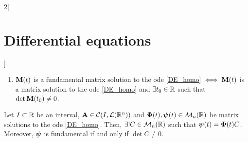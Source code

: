 \documentclass[../../../main.tex]{subfiles}
\begin{document}
\begin{multicols}{2}[\section{Differential equations}]
\begin{prop}
\begin{enumerate}
      \item $\boldsymbol{\mathrm{M}}(t)$ is a fundamental matrix solution to the ode \eqref{DE_homo} $\iff\boldsymbol{\mathrm{M}}(t)$ is a matrix solution to the ode \eqref{DE_homo} and $\exists t_0\in\mathbb{R}$ such that $\det\boldsymbol{\mathrm{M}}(t_0)\ne 0$.
    \end{enumerate}
  \end{prop}
  \begin{prop}
    Let $I\subset \mathbb{R}$ be an interval, $\boldsymbol{\mathrm{A}}\in\mathcal{C}(I,\mathcal{L}(\mathbb{R}^n))$ and $\boldsymbol{\mathrm{\Phi}}(t),\boldsymbol{\mathrm{\psi}}(t)\in\mathcal{M}_n(\mathbb{R})$ be matrix solutions to the ode \eqref{DE_homo}. Then, $\exists! C\in\mathcal{M}_n(\mathbb{R})$ such that $\boldsymbol{\mathrm{\psi}}(t)=\boldsymbol{\mathrm{\Phi}}(t)C$. Moreover, $\boldsymbol{\mathrm{\psi}}$ is fundamental if and only if $\det C\ne 0$.
  \end{prop}
\end{multicols}
\end{document}
